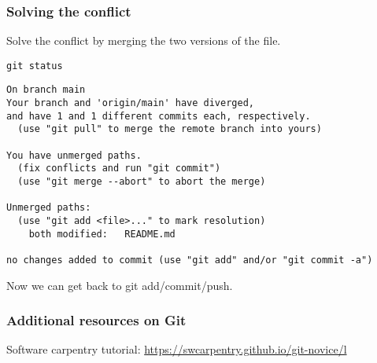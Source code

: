 \documentclass{beamer}
\begin{document}
	\begin{frame}[fragile]
		\frametitle{Solving the conflict}
		
		Solve the conflict by merging the two versions of the file.

		\begin{exampleblock}{}
		\begin{BVerbatim}
git status
		\end{BVerbatim}
		\end{exampleblock}{}

		\begin{exampleblock}{}
		\begin{tiny}
		\begin{BVerbatim}
On branch main
Your branch and 'origin/main' have diverged,
and have 1 and 1 different commits each, respectively.
  (use "git pull" to merge the remote branch into yours)

You have unmerged paths.
  (fix conflicts and run "git commit")
  (use "git merge --abort" to abort the merge)

Unmerged paths:
  (use "git add <file>..." to mark resolution)
	both modified:   README.md

no changes added to commit (use "git add" and/or "git commit -a")
		\end{BVerbatim}
		\end{tiny}
		\end{exampleblock}{}		

		Now we can get back to git add/commit/push.
	\end{frame}

	\begin{frame}
		\frametitle{Additional resources on Git}

		Software carpentry tutorial: \href{https://swcarpentry.github.io/git-novice/}{https://swcarpentry.github.io/git-novice/l}
	\end{frame}
\end{document}
